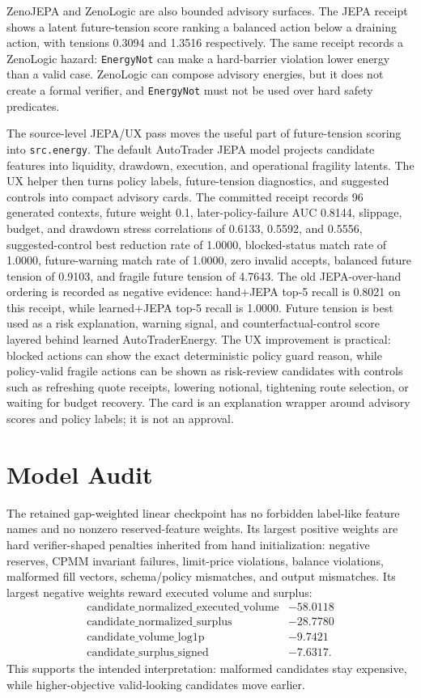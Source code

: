 \documentclass[11pt]{article}
\begin{document}
ZenoJEPA and ZenoLogic are also bounded advisory surfaces. The JEPA receipt
shows a latent future-tension score ranking a balanced action below a draining
action, with tensions 0.3094 and 1.3516 respectively. The same receipt records
a ZenoLogic hazard: \texttt{EnergyNot} can make a hard-barrier violation lower
energy than a valid case. ZenoLogic can compose advisory energies, but it does
not create a formal verifier, and \texttt{EnergyNot} must not be used over hard
safety predicates.

The source-level JEPA/UX pass moves the useful part of future-tension scoring
into \texttt{src.energy}. The default AutoTrader JEPA model projects candidate
features into liquidity, drawdown, execution, and operational fragility
latents. The UX helper then turns policy labels, future-tension diagnostics,
and suggested controls into compact advisory cards. The committed receipt
records 96 generated contexts, future weight 0.1, later-policy-failure AUC
0.8144, slippage, budget, and drawdown stress correlations of 0.6133, 0.5592,
and 0.5556, suggested-control best reduction rate of 1.0000, blocked-status
match rate of 1.0000, future-warning match rate of 1.0000, zero invalid
accepts, balanced future tension of 0.9103, and fragile future tension of
4.7643. The old JEPA-over-hand ordering is recorded as negative evidence:
hand+JEPA top-5 recall is 0.8021 on this receipt, while learned+JEPA top-5
recall is 1.0000. Future tension is best used as a risk explanation, warning
signal, and counterfactual-control score layered behind learned AutoTraderEnergy.
The UX improvement is practical: blocked actions can show the exact
deterministic policy guard reason, while policy-valid fragile actions can be
shown as risk-review candidates with controls such as refreshing quote
receipts, lowering notional, tightening route selection, or waiting for budget
recovery. The card is an explanation wrapper around advisory scores and policy
labels; it is not an approval.

\section{Model Audit}

The retained gap-weighted linear checkpoint has no forbidden label-like feature
names and no nonzero reserved-feature weights. Its largest positive weights are hard
verifier-shaped penalties inherited from hand initialization: negative reserves,
CPMM invariant failures, limit-price violations, balance violations, malformed
fill vectors, schema/policy mismatches, and output mismatches. Its largest
negative weights reward executed volume and surplus:
\[
\begin{array}{lr}
\mathrm{candidate\_normalized\_executed\_volume} & -58.0118 \\
\mathrm{candidate\_normalized\_surplus} & -28.7780 \\
\mathrm{candidate\_volume\_log1p} & -9.7421 \\
\mathrm{candidate\_surplus\_signed} & -7.6317.
\end{array}
\]
This supports the intended interpretation: malformed candidates stay expensive,
while higher-objective valid-looking candidates move earlier.
\end{document}
